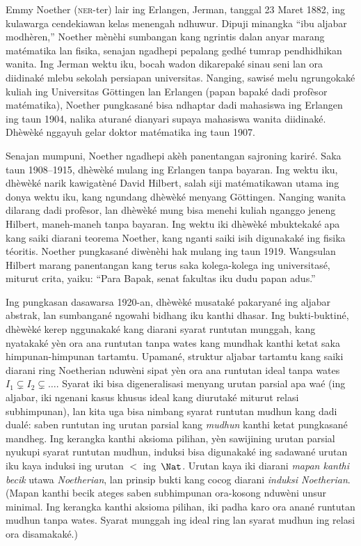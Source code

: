 \documentclass[../../../include/open-logic-section]{subfiles}
\begin{document}



Emmy Noether (\textsc{ner}-ter) lair ing Erlangen,
Jerman, tanggal 23 Maret 1882, ing kulawarga
cendekiawan kelas menengah ndhuwur. Dipuji
minangka ``ibu aljabar modhèren,'' Noether
mènèhi sumbangan kang ngrintis dalan anyar
marang matématika lan fisika, senajan ngadhepi
pepalang gedhé tumrap pendhidhikan wanita.
Ing Jerman wektu iku, bocah wadon dikarepaké
sinau seni lan ora diidinaké mlebu sekolah
persiapan universitas. Nanging, sawisé
melu ngrungokaké kuliah ing Universitas
G\"{o}ttingen lan Erlangen (papan bapaké
dadi profèsor matématika), Noether
pungkasané bisa ndhaptar dadi mahasiswa
ing Erlangen ing taun 1904, nalika aturané
dianyari supaya mahasiswa wanita
diidinaké. Dhèwèké nggayuh gelar doktor
matématika ing taun 1907.

Senajan mumpuni, Noether ngadhepi akèh
panentangan sajroning kariré. Saka taun
1908--1915, dhèwèké mulang ing Erlangen
tanpa bayaran. Ing wektu iku, dhèwèké
narik kawigatèné David Hilbert, salah
siji matématikawan utama ing donya
wektu iku, kang ngundang dhèwèké
menyang G\"{o}ttingen. Nanging wanita
dilarang dadi profèsor, lan dhèwèké
mung bisa menehi kuliah nganggo
jeneng Hilbert, maneh-maneh tanpa
bayaran. Ing wektu iki dhèwèké
mbuktekaké apa kang saiki diarani
teorema Noether, kang nganti saiki
isih digunakaké ing fisika téoritis.
Noether pungkasané diwènèhi hak
mulang ing taun 1919. Wangsulan
Hilbert marang panentangan kang
terus saka kolega-kolega ing
universitasé, miturut crita,
yaiku: ``Para Bapak, senat fakultas
iku dudu papan adus.''

Ing pungkasan dasawarsa 1920-an,
dhèwèké musataké pakaryané ing
aljabar abstrak, lan sumbangané
ngowahi bidhang iku kanthi dhasar.
Ing bukti-buktiné, dhèwèké kerep
nggunakaké kang diarani syarat
runtutan munggah, kang nyatakaké
yèn ora ana runtutan tanpa wates
kang mundhak kanthi ketat saka
himpunan-himpunan tartamtu. Upamané,
struktur aljabar tartamtu kang
saiki diarani ring Noetherian
nduwèni sipat yèn ora ana
runtutan ideal tanpa wates
$I_1 \subsetneq I_2 \subsetneq \dots$.
Syarat iki bisa digeneralisasi
menyang urutan parsial apa waé
(ing aljabar, iki ngenani kasus
khusus ideal kang diurutaké
miturut relasi subhimpunan), lan
kita uga bisa nimbang syarat
runtutan mudhun kang dadi dualé:
saben runtutan ing urutan parsial
kang \emph{mudhun} kanthi ketat
pungkasané mandheg. Ing kerangka kanthi aksioma pilihan, yèn sawijining
urutan parsial nyukupi syarat
runtutan mudhun, induksi bisa
digunakaké ing sadawané urutan
iku kaya induksi ing urutan
$<$ ing~$\Nat$. Urutan kaya
iki diarani \emph{mapan kanthi becik}
utawa \emph{Noetherian}, lan
prinsip bukti kang cocog diarani
\emph{induksi Noetherian}.
(Mapan kanthi becik ateges saben subhimpunan ora-kosong nduwèni unsur minimal. Ing kerangka kanthi aksioma pilihan, iki padha karo ora anané runtutan mudhun tanpa wates. Syarat munggah ing ideal ring lan syarat mudhun ing relasi ora disamakaké.)
\end{document}
